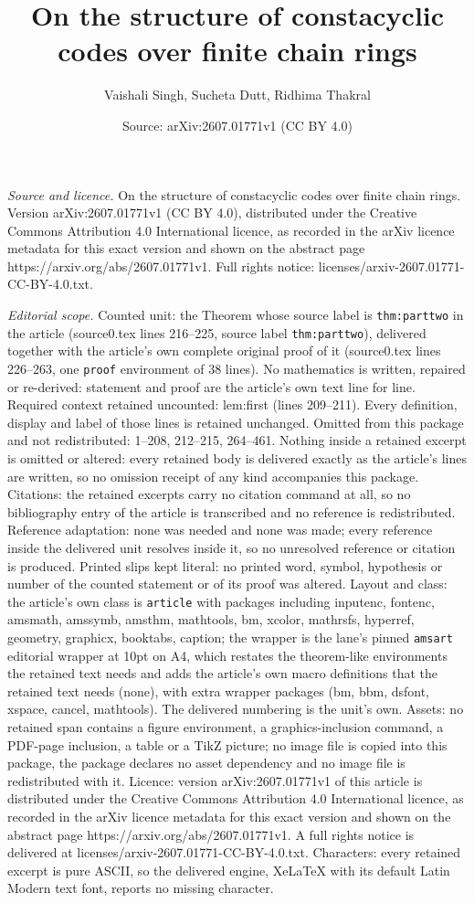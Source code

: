 \documentclass[10pt,a4paper]{amsart}
\title[On the structure of constacyclic codes over finite chain rin]{On the structure of constacyclic codes over finite chain rings}
\author{Vaishali Singh, Sucheta Dutt, Ridhima Thakral}
\date{Source: arXiv:2607.01771v1 (CC BY 4.0)}
\begin{document}
\maketitle

\noindent\emph{Source and licence.} On the structure of constacyclic codes over finite chain rings. Version arXiv:2607.01771v1 (CC BY 4.0), distributed under the Creative Commons Attribution 4.0 International licence, as recorded in the arXiv licence metadata for this exact version and shown on the abstract page https://arxiv.org/abs/2607.01771v1. Full rights notice: licenses/arxiv-2607.01771-CC-BY-4.0.txt.\par\smallskip

\noindent\textit{Editorial scope.} Counted unit: the Theorem whose source label is \texttt{thm:parttwo} in the article (source0.tex lines 216--225, source label \texttt{thm:parttwo}), delivered together with the article's own complete original proof of it (source0.tex lines 226--263, one \texttt{proof} environment of 38 lines). No mathematics is written, repaired or re-derived: statement and proof are the article's own text line for line. Required context retained uncounted: lem:first (lines 209--211). Every definition, display and label of those lines is retained unchanged. Omitted from this package and not redistributed: 1--208, 212--215, 264--461. Nothing inside a retained excerpt is omitted or altered: every retained body is delivered exactly as the article's lines are written, so no omission receipt of any kind accompanies this package. Citations: the retained excerpts carry no citation command at all, so no bibliography entry of the article is transcribed and no reference is redistributed. Reference adaptation: none was needed and none was made; every reference inside the delivered unit resolves inside it, so no unresolved reference or citation is produced. Printed slips kept literal: no printed word, symbol, hypothesis or number of the counted statement or of its proof was altered. Layout and class: the article's own class is \texttt{article} with packages including inputenc, fontenc, amsmath, amssymb, amsthm, mathtools, bm, xcolor, mathrsfs, hyperref, geometry, graphicx, booktabs, caption; the wrapper is the lane's pinned \texttt{amsart} editorial wrapper at 10pt on A4, which restates the theorem-like environments the retained text needs and adds the article's own macro definitions that the retained text needs (none), with extra wrapper packages (bm, bbm, dsfont, xspace, cancel, mathtools). The delivered numbering is the unit's own. Assets: no retained span contains a figure environment, a graphics-inclusion command, a PDF-page inclusion, a table or a TikZ picture; no image file is copied into this package, the package declares no asset dependency and no image file is redistributed with it. Licence: version arXiv:2607.01771v1 of this article is distributed under the Creative Commons Attribution 4.0 International licence, as recorded in the arXiv licence metadata for this exact version and shown on the abstract page https://arxiv.org/abs/2607.01771v1. A full rights notice is delivered at licenses/arxiv-2607.01771-CC-BY-4.0.txt. Characters: every retained excerpt is pure ASCII, so the delivered engine, XeLaTeX with its default Latin Modern text font, reports no missing character.
\end{document}

